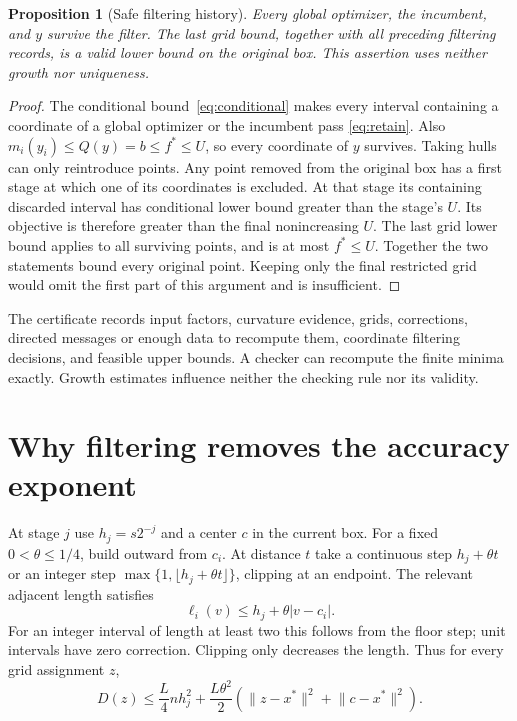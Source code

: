 \documentclass[11pt]{article}
\newtheorem{proposition}[theorem]{Proposition}
\theoremstyle{remark}
\newcommand{\norm}[1]{\lVert#1\rVert}
\newcommand{\OPT}{f^*}
\begin{document}
\begin{proposition}[Safe filtering history]\label{prop:filter}
Every global optimizer, the incumbent, and $y$ survive the filter.
The last grid bound, together with all preceding filtering records,
is a valid lower bound on the original box. This assertion uses neither
growth nor uniqueness.
\end{proposition}
\begin{proof}
The conditional bound~\eqref{eq:conditional} makes every interval
containing a coordinate of a global optimizer or the incumbent pass
\eqref{eq:retain}. Also $m_i(y_i)\le Q(y)=b\le\OPT\le U$, so every
coordinate of $y$ survives. Taking hulls can only reintroduce points.
Any point removed from the original box has a first stage at which one
of its coordinates is excluded. At that stage its containing discarded
interval has conditional lower bound greater than the stage's $U$.
Its objective is therefore greater than the final nonincreasing $U$.
The last grid lower bound applies to all surviving points, and is at
most $\OPT\le U$. Together the two statements bound every original
point. Keeping only the final restricted grid would omit the first part
of this argument and is insufficient.
\end{proof}

The certificate records input factors, curvature evidence, grids,
corrections, directed messages or enough data to recompute them,
coordinate filtering decisions, and feasible upper bounds. A checker
can recompute the finite minima exactly. Growth estimates influence
neither the checking rule nor its validity.

\section{Why filtering removes the accuracy exponent}\label{sec:rate}

At stage $j$ use $h_j=s2^{-j}$ and a center $c$ in the current box.
For a fixed $0<\theta\le1/4$, build outward from $c_i$. At distance $t$
take a continuous step $h_j+\theta t$ or an integer step
$\max\{1,\lfloor h_j+\theta t\rfloor\}$, clipping at an endpoint.
The relevant adjacent length satisfies
\begin{equation}\label{eq:mesh}
\ell_i(v)\le h_j+\theta|v-c_i|.
\end{equation}
For an integer interval of length at least two this follows from the
floor step; unit intervals have zero correction. Clipping only decreases
the length. Thus for every grid assignment $z$,
\begin{equation}\label{eq:penaltyenergy}
D(z)\le\frac L4nh_j^2+
\frac{L\theta^2}{2}\left(\norm{z-x^*}^2+\norm{c-x^*}^2\right).
\end{equation}
\end{document}
